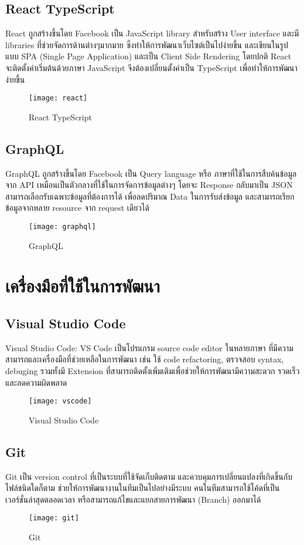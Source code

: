 \subsection{React TypeScript}
React ถูกสร้างขึ้นโดย Facebook เป็น JavaScript library สำหรับสร้าง User interface และมี libraries ที่ช่วยจัดการด้านต่างๆมากมาย ซึ่งทำให้การพัฒนาเว็บไซต์เป็นไปง่ายขึ้น
และเขียนในรูปแบบ SPA (Single Page Application) และเป็น Client Side Rendering
โดยปกติ React จะติดตั้งค่าเริ่มต้นด้วยภาษา JavaScript จึงต้องเปลี่ยนตั้งค่าเป็น TypeScript เพื่อทำให้การพัฒนาง่ายขึ้น
\begin{figure}[!h]
	\centering
	\texttt{[image: react]}
	\caption{React TypeScript}
	\label{Fig:react}
\end{figure}

\subsection{GraphQL}
GraphQL ถูกสร้างขึ้นโดย Facebook เป็น Query language หรือ ภาษาที่ใช้ในการสืบค้นข้อมูลจาก API เหมือนเป็นตัวกลางที่ใช้ในการจัดการข้อมูลต่างๆ โดยจะ Response กลับมาเป็น JSON สามารถเลือกรับเฉพาะข้อมูลที่ต้องการได้ เพื่อลดปริมาณ Data ในการรับส่งข้อมูล และสามารถเรียกข้อมูลจากหลาย resource จาก request เดียวได้
\begin{figure}[!h]
	\centering
	\texttt{[image: graphql]}
	\caption{GraphQL}
	\label{Fig:graphql}
\end{figure}

\section{เครื่องมือที่ใช้ในการพัฒนา}
\subsection{Visual Studio Code}
Visual Studio Code: VS Code เป็นโปรแกรม source code editor ในหลายภาษา ที่มีความสามารถและเครื่องมือที่ช่วยเหลือในการพัฒนา เช่น ใช้ code refactoring, ตรวจสอบ syntax, debuging รวมทั้งมี Extension ที่สามารถติดตั้งเพิ่มเติมเพื่อช่วยให้การพัฒนามีความสะดวก รวดเร็วและลดความผิดพลาด
\begin{figure}[!h]
	\centering
	\texttt{[image: vscode]}
	\caption{Visual Studio Code}
	\label{Fig:vscode}
\end{figure}
\subsection{Git}
Git เป็น version control ที่เป็นระบบที่ใช้จัดเก็บติดตาม และควบคุมการเปลี่ยนแปลงที่เกิดขึ้นกับไฟล์ชนิดใดก็ตาม ช่วยให้การพัฒนางานในทีมเป็นไปอย่างมีระบบ คนในทีมสามารถใช้โค้ดที่เป็นเวอร์ชั่นล่าสุดตลอดเวลา หรือสามารถแก้ไขและแยกสายการพัฒนา (Branch) ออกมาได้
\begin{figure}[!h]
	\centering
	\texttt{[image: git]}
	\caption{Git}
	\label{Fig:git}
\end{figure}
